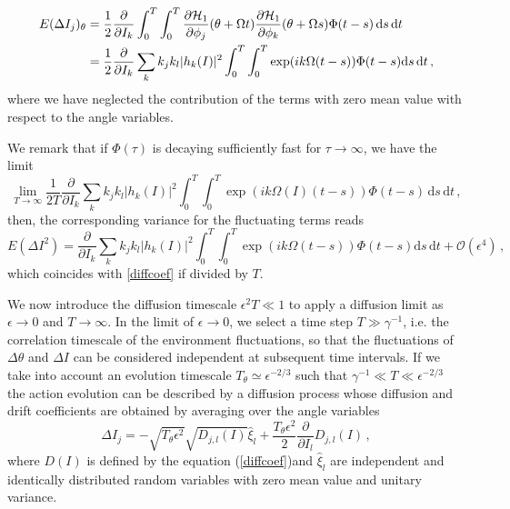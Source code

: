 \begin{equation}
    \begin{aligned}
    E(\Delta I_j)_\theta&=\frac{1}{2}\frac{\partial}{\partial I_k}\int_0^T\int_0^T
     \frac{\partial \mathcal{H}_1}{\partial \phi_j}(\theta+\Omega t)\frac{\partial \mathcal{H}_1}{\partial \phi_k}(\theta+\Omega s)\Phi(t-s)\, \mathrm{d}s\,\mathrm{d}t \\
    &=
    \frac{1}{2} \frac{\partial}{\partial I_k}\sum_k k_jk_l |h_k(I)|^2
    \int_0^T\int_0^T \exp(ik\Omega (t-s))\Phi(t-s) \mathrm{d}s\,\mathrm{d}t\,,
    \end{aligned}
\end{equation}
where we have neglected the contribution of the terms with zero mean value with respect to the angle variables. 

We remark that if $\Phi(\tau)$ is decaying sufficiently fast for $\tau\to\infty$, we have the limit
\begin{equation}
    \lim_{T\to \infty} \frac{1}{2T} \frac{\partial}{\partial I_k}\sum_k k_jk_l |h_k(I)|^2\int_0^T\int_0^T \exp(ik\Omega(I) (t-s))\Phi(t-s) \,\mathrm{d}s\,\mathrm{d}t \,,
\end{equation}
then, the corresponding variance for the fluctuating terms reads
\begin{equation}
    E(\Delta I^2)=\frac{\partial}{\partial I_k}\sum_k k_jk_l |h_k(I)|^2
    \int_0^T\int_0^T \exp(ik\Omega (t-s))\Phi(t-s) \mathrm{d}s\,\mathrm{d}t+\mathcal{O}(\epsilon^4)\,,
\end{equation}
which coincides with \eqref{diffcoef} if divided by $T$.

We now introduce the diffusion timescale $\epsilon^2 T\ll 1$ to apply a diffusion limit as $\epsilon \to 0$ and $T\to \infty$. In the limit of $\epsilon \to 0$, we select a time step $T\gg \gamma^{-1}$, i.e. the correlation timescale of the environment fluctuations, so that the fluctuations of $\Delta \theta$ and $\Delta I$ can be considered independent at subsequent time intervals. If we take into account an evolution timescale $T_\theta\simeq \epsilon^{-2/3}$ such that $\gamma^{-1}\ll T\ll \epsilon^{-2/3}$ the action evolution can be described by a diffusion process whose diffusion and drift coefficients are obtained by averaging over the angle variables
\begin{equation}
    \Delta I_j=-\sqrt{T_\theta \epsilon^2}\sqrt{D_{j,l}(I)}\hat \xi_l+
    \frac{T_\theta\epsilon^2}{2} \frac{\partial}{\partial I_l}D_{j,l}(I) \,,
    \label{stocproc}
\end{equation}
where $D(I)$ is defined by the equation (\ref{diffcoef})and $\hat \xi_l$ are independent and identically distributed random variables with zero mean value and unitary variance.

